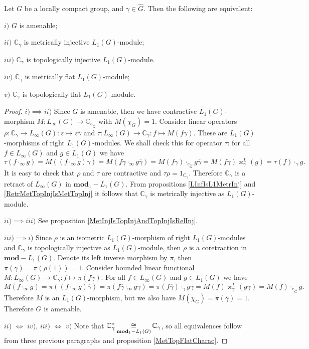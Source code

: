 \begin{proposition}\label{OneDimL1ModMetTopInjFlatCharac} Let $G$ be a locally compact group, and $\gamma\in\widehat{G}$. Then the following are equivalent:

$i)$ $G$ is amenable;

$ii)$ $\mathbb{C}_\gamma$ is metrically injective $L_1(G)$-module;

$iii)$ $\mathbb{C}_\gamma$ is topologically injective $L_1(G)$-module.

$iv)$ $\mathbb{C}_\gamma$ is metrically flat $L_1(G)$-module;

$v)$ $\mathbb{C}_\gamma$ is topologically flat $L_1(G)$-module.
\end{proposition}
\begin{proof} $i)$$\implies$$ ii)$ Since $G$ is amenable, then we have contractive $L_1(G)$-morphism $M:L_\infty(G)\to\mathbb{C}_{e_{\widehat{G}}}$ with $M(\chi_G)=1$. Consider linear operators $\rho:\mathbb{C}_\gamma\to L_\infty(G):z\mapsto z\overline{\gamma}$ and $\tau:L_\infty(G)\to\mathbb{C}_\gamma:f\mapsto M(f\gamma)$. These are $L_1(G)$-morphisms of right $L_1(G)$-modules. We shall check this for operator $\tau$: for all $f\in L_\infty(G)$ and $g\in L_1(G)$ we have
$$
\tau(f\cdot_\infty g)
=M((f\cdot_\infty g)\gamma)
=M(f\gamma\cdot_\infty g\overline{\gamma})
=M(f\gamma)\cdot_{e_{\widehat{G}}} g\overline{\gamma}
=M(f\gamma)\varkappa_\gamma^L(g)
=\tau(f)\cdot_{\gamma} g.
$$  
It is easy to check that $\rho$ and $\tau$ are contractive and $\tau\rho=1_{\mathbb{C}_\gamma}$. Therefore $\mathbb{C}_\gamma$ is a retract of $L_\infty(G)$ in $\mathbf{mod}_1-L_1(G)$. From propositions \ref{LInfIsL1MetrInj} and \ref{RetrMetTopInjIsMetTopInj} it follows that $\mathbb{C}_\gamma$ is metrically injective as $L_1(G)$-module.

$ii)$$\implies$$ iii)$ See proposition \ref{MetInjIsTopInjAndTopInjIsRelInj}.

$iii)$$ \implies$$ i)$ Since $\rho$ is an isometric $L_1(G)$-morphism of right $L_1(G)$-modules and $\mathbb{C}_\gamma$ is topologically injective as $L_1(G)$-module, then $\rho$ is a coretraction in $\mathbf{mod}-L_1(G)$. Denote its left inverse morphism by $\pi$, then $\pi(\overline{\gamma})=\pi(\rho(1))=1$. Consider bounded linear functional $M:L_\infty(G)\to\mathbb{C}_\gamma:f\mapsto \pi(f\overline{\gamma})$. For all $f\in L_\infty(G)$ and $g\in L_1(G)$ we have
$$
M(f\cdot_\infty g)
=\pi((f\cdot_\infty g)\overline{\gamma})
=\pi(f\overline{\gamma}\cdot_\infty g\gamma)
=\pi(f\overline{\gamma})\cdot_{\gamma} g\gamma
=M(f)\varkappa_\gamma^L(g\gamma)
=M(f)\cdot_{e_{\widehat{G}}}g.
$$
Therefore $M$ is an $L_1(G)$-morphism, but we also have $M(\chi_G)=\pi(\overline{\gamma})=1$. Therefore $G$ is amenable.

$ii)$ $\Longleftrightarrow$ $iv)$, $iii)$ $\Longleftrightarrow$ $v)$ Note that $\mathbb{C}_\gamma^*\mathop{\mathbin{\cong}}\limits_{\mathbf{mod}_1-L_1(G)}\mathbb{C}_\gamma$, so all equivalences  follow from three previous paragraphs and proposition \ref{MetTopFlatCharac}.
\end{proof}

